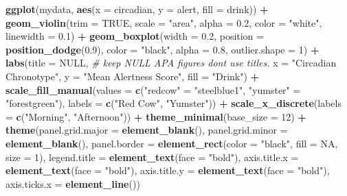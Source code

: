 \documentclass[
]{book}
\newenvironment{Shaded}{\begin{snugshade}}{\end{snugshade}}
\newcommand{\AttributeTok}[1]{\textcolor[rgb]{0.13,0.29,0.53}{#1}}
\newcommand{\CommentTok}[1]{\textcolor[rgb]{0.56,0.35,0.01}{\textit{#1}}}
\newcommand{\ConstantTok}[1]{\textcolor[rgb]{0.56,0.35,0.01}{#1}}
\newcommand{\DecValTok}[1]{\textcolor[rgb]{0.00,0.00,0.81}{#1}}
\newcommand{\FloatTok}[1]{\textcolor[rgb]{0.00,0.00,0.81}{#1}}
\newcommand{\FunctionTok}[1]{\textcolor[rgb]{0.13,0.29,0.53}{\textbf{#1}}}
\newcommand{\NormalTok}[1]{#1}
\newcommand{\OtherTok}[1]{\textcolor[rgb]{0.56,0.35,0.01}{#1}}
\newcommand{\SpecialCharTok}[1]{\textcolor[rgb]{0.81,0.36,0.00}{\textbf{#1}}}
\newcommand{\StringTok}[1]{\textcolor[rgb]{0.31,0.60,0.02}{#1}}
\begin{document}
\begin{Shaded}
\begin{Highlighting}[]
\FunctionTok{ggplot}\NormalTok{(mydata, }\FunctionTok{aes}\NormalTok{(}\AttributeTok{x =}\NormalTok{ circadian, }\AttributeTok{y =}\NormalTok{ alert, }\AttributeTok{fill =}\NormalTok{ drink)) }\SpecialCharTok{+}
  \FunctionTok{geom\_violin}\NormalTok{(}\AttributeTok{trim =} \ConstantTok{TRUE}\NormalTok{, }\AttributeTok{scale =} \StringTok{"area"}\NormalTok{, }\AttributeTok{alpha =} \FloatTok{0.2}\NormalTok{, }\AttributeTok{color =} \StringTok{"white"}\NormalTok{, }\AttributeTok{linewidth =} \FloatTok{0.1}\NormalTok{) }\SpecialCharTok{+}
  \FunctionTok{geom\_boxplot}\NormalTok{(}\AttributeTok{width =} \FloatTok{0.2}\NormalTok{, }\AttributeTok{position =} \FunctionTok{position\_dodge}\NormalTok{(}\FloatTok{0.9}\NormalTok{), }\AttributeTok{color =} \StringTok{"black"}\NormalTok{, }\AttributeTok{alpha =} \FloatTok{0.8}\NormalTok{, }\AttributeTok{outlier.shape =} \DecValTok{1}\NormalTok{) }\SpecialCharTok{+}
  \FunctionTok{labs}\NormalTok{(}\AttributeTok{title =} \ConstantTok{NULL}\NormalTok{,   }\CommentTok{\# keep NULL APA figures don\textquotesingle{}t use titles.}
       \AttributeTok{x =} \StringTok{"Circadian Chronotype"}\NormalTok{,  }
       \AttributeTok{y =} \StringTok{"Mean Alertness Score"}\NormalTok{,}
       \AttributeTok{fill =} \StringTok{"Drink"}\NormalTok{) }\SpecialCharTok{+}
  \FunctionTok{scale\_fill\_manual}\NormalTok{(}\AttributeTok{values =} \FunctionTok{c}\NormalTok{(}\StringTok{"redcow"} \OtherTok{=} \StringTok{"steelblue1"}\NormalTok{, }\StringTok{"yumster"} \OtherTok{=} \StringTok{"forestgreen"}\NormalTok{), }
                    \AttributeTok{labels =} \FunctionTok{c}\NormalTok{(}\StringTok{"Red Cow"}\NormalTok{, }\StringTok{"Yumster"}\NormalTok{)) }\SpecialCharTok{+}
  \FunctionTok{scale\_x\_discrete}\NormalTok{(}\AttributeTok{labels =} \FunctionTok{c}\NormalTok{(}\StringTok{"Morning"}\NormalTok{, }\StringTok{"Afternoon"}\NormalTok{)) }\SpecialCharTok{+}
  \FunctionTok{theme\_minimal}\NormalTok{(}\AttributeTok{base\_size =} \DecValTok{12}\NormalTok{) }\SpecialCharTok{+}
  \FunctionTok{theme}\NormalTok{(}\AttributeTok{panel.grid.major =} \FunctionTok{element\_blank}\NormalTok{(),}
        \AttributeTok{panel.grid.minor =} \FunctionTok{element\_blank}\NormalTok{(),}
        \AttributeTok{panel.border =} \FunctionTok{element\_rect}\NormalTok{(}\AttributeTok{color =} \StringTok{"black"}\NormalTok{, }\AttributeTok{fill =} \ConstantTok{NA}\NormalTok{, }\AttributeTok{size =} \DecValTok{1}\NormalTok{),}
        \AttributeTok{legend.title =} \FunctionTok{element\_text}\NormalTok{(}\AttributeTok{face =} \StringTok{"bold"}\NormalTok{),}
        \AttributeTok{axis.title.x =} \FunctionTok{element\_text}\NormalTok{(}\AttributeTok{face =} \StringTok{"bold"}\NormalTok{),}
        \AttributeTok{axis.title.y =} \FunctionTok{element\_text}\NormalTok{(}\AttributeTok{face =} \StringTok{"bold"}\NormalTok{),}
        \AttributeTok{axis.ticks.x =} \FunctionTok{element\_line}\NormalTok{())}
\end{Highlighting}
\end{Shaded}
\end{document}
